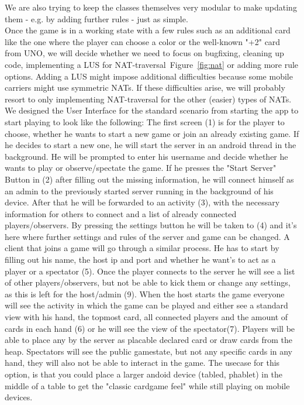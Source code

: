 \documentclass{report}
\newcommand{\rfig}[1]{Figure~\ref{fig:#1}}
\begin{document}
We are also trying to keep the classes themselves very modular to make updating them - e.g. by adding further rules - just as simple.\\
Once the game is in a working state with a few rules such as an additional card like the one where the player can choose a color or the well-known "+2" card from UNO, we will decide whether we need to focus on bugfixing, cleaning up code, implementing a LUS for NAT-traversal~\rfig{nat} or adding more rule options. Adding a LUS might impose additional difficulties because some mobile carriers might use symmetric NATs. If these difficulties arise, we will probably resort to only implementing NAT-traversal for the other (easier) types of NATs.\\

We designed the User Interface for the standard scenario from starting the app to start playing to look like the following: The first screen (1) is for the player to choose, whether he wants to start a new game or join an already existing game. If he decides to start a new one, he will start the server in an android thread in the background. He will be prompted to enter his username and decide whether he wants to play or observe/spectate the game. If he presses the "Start Server" Button in (2) after filling out the missing information, he will connect himself as an admin to the previously started server running in the background of his device. After that he will be forwarded to an activity (3), with the necessary information for others to connect and a list of already connected players/observers. By pressing the settings button he will be taken to (4) and it's here where further settings and rules of the server and game can be changed. A client that joins a game will go through a similar process. He has to start by filling out his name, the host ip and port and whether he want's to act as a player or a spectator (5). Once the player connects to the server he will see a list of other players/observers, but not be able to kick them or change any settings, as this is left for the host/admin (9). When the host starts the game everyone will see the activity in which the game can be played and either see a standard view with his hand, the topmost card, all connected players and the amount of cards in each hand (6) or he will see the view of the spectator(7). Players will be able to place any by the server as placable declared card or draw cards from the heap. Spectators will see the public gamestate, but not any specific cards in any hand, they will also not be able to interact in the game. The usecase for this option, is that you could place a larger andoid device (tabled, phablet) in the middle of a table to get the "classic cardgame feel" while still playing on mobile devices. \\
\end{document}
